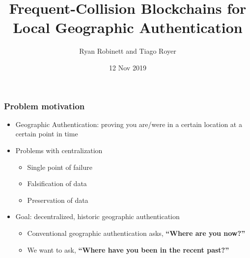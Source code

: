 \documentclass{beamer}
\begin{document}
\title{Frequent-Collision Blockchains for Local Geographic Authentication}
\author{Ryan Robinett and Tiago Royer}
\date{12 Nov 2019}

\begin{frame}
    \titlepage
\end{frame}

\begin{frame}
	\frametitle{Problem motivation}

	\begin{itemize}
		\item Geographic Authentication:
			proving you are/were in a certain location
			at a certain point in time
		\item Problems with centralization
			\begin{itemize}
				\item Single point of failure
				\item Falsification of data
				\item Preservation of data
			\end{itemize}
		\item Goal: decentralized, historic geographic authentication
			\begin{itemize}
				\item Conventional geographic authentication asks, \textbf{``Where are you now?''}
				\item We want to ask, \textbf{``Where have you been in the recent past?''}
			\end{itemize}
	\end{itemize}
\end{frame}
\end{document}
